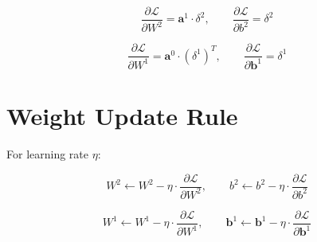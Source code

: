\documentclass{article}
\begin{document}
\[
\frac{\partial \mathcal{L}}{\partial W^2} = \mathbf{a}^1 \cdot \delta^2, \qquad
\frac{\partial \mathcal{L}}{\partial b^2} = \delta^2
\]

\[
\frac{\partial \mathcal{L}}{\partial W^1} = \mathbf{a}^0 \cdot (\delta^1)^T, \qquad
\frac{\partial \mathcal{L}}{\partial \mathbf{b}^1} = \delta^1
\]

\section*{Weight Update Rule}

For learning rate $\eta$:

\[
W^2 \leftarrow W^2 - \eta \cdot \frac{\partial \mathcal{L}}{\partial W^2}, \qquad
b^2 \leftarrow b^2 - \eta \cdot \frac{\partial \mathcal{L}}{\partial b^2}
\]

\[
W^1 \leftarrow W^1 - \eta \cdot \frac{\partial \mathcal{L}}{\partial W^1}, \qquad
\mathbf{b}^1 \leftarrow \mathbf{b}^1 - \eta \cdot \frac{\partial \mathcal{L}}{\partial \mathbf{b}^1}
\]
\end{document}
